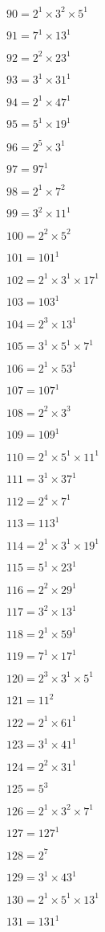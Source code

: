 $90 = 2^{1} × 3^{2} × 5^{1}$

$91 = 7^{1} × 13^{1}$

$92 = 2^{2} × 23^{1}$

$93 = 3^{1} × 31^{1}$

$94 = 2^{1} × 47^{1}$

$95 = 5^{1} × 19^{1}$

$96 = 2^{5} × 3^{1}$

$97 = 97^{1}$

$98 = 2^{1} × 7^{2}$

$99 = 3^{2} × 11^{1}$

$100 = 2^{2} × 5^{2}$

$101 = 101^{1}$

$102 = 2^{1} × 3^{1} × 17^{1}$

$103 = 103^{1}$

$104 = 2^{3} × 13^{1}$

$105 = 3^{1} × 5^{1} × 7^{1}$

$106 = 2^{1} × 53^{1}$

$107 = 107^{1}$

$108 = 2^{2} × 3^{3}$

$109 = 109^{1}$

$110 = 2^{1} × 5^{1} × 11^{1}$

$111 = 3^{1} × 37^{1}$

$112 = 2^{4} × 7^{1}$

$113 = 113^{1}$

$114 = 2^{1} × 3^{1} × 19^{1}$

$115 = 5^{1} × 23^{1}$

$116 = 2^{2} × 29^{1}$

$117 = 3^{2} × 13^{1}$

$118 = 2^{1} × 59^{1}$

$119 = 7^{1} × 17^{1}$

$120 = 2^{3} × 3^{1} × 5^{1}$

$121 = 11^{2}$

$122 = 2^{1} × 61^{1}$

$123 = 3^{1} × 41^{1}$

$124 = 2^{2} × 31^{1}$

$125 = 5^{3}$

$126 = 2^{1} × 3^{2} × 7^{1}$

$127 = 127^{1}$

$128 = 2^{7}$

$129 = 3^{1} × 43^{1}$

$130 = 2^{1} × 5^{1} × 13^{1}$

$131 = 131^{1}$

